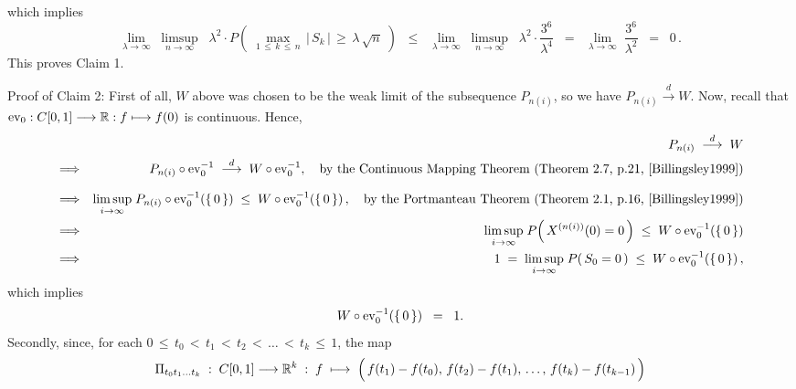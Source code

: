 which implies
\begin{equation*}
	\underset{\lambda\rightarrow\infty}{\lim}\;
	\underset{n\rightarrow\infty}{\limsup}\;\;
	\lambda^{2}\cdot
	P\!\left(\;\underset{1\,\leq\,k\,\leq\,n}{\max}\,\vert\,S_{k}\,\vert\,\geq\,\lambda\,\sqrt{n}\;\right)
\;\;\leq\;\;
	\underset{\lambda\rightarrow\infty}{\lim}\;
	\underset{n\rightarrow\infty}{\limsup}\;\;
	\lambda^{2}\cdot\dfrac{3^{6}}{\lambda^{4}}
\;\;=\;\;
	\underset{\lambda\rightarrow\infty}{\lim}\;
	\dfrac{3^{6}}{\lambda^{2}}
\;\;=\;\; 0\,.
\end{equation*}
This proves Claim 1.

\vskip 0.5cm
\noindent
Proof of Claim 2:\quad
First of all, $W$ above was chosen to be the weak limit of the subsequence $P_{n(i)}$,
so we have $P_{n(i)} \overset{d}{\longrightarrow} W$.
Now, recall that $\textnormal{ev}_{0} : C[0,1] \longrightarrow \mathbb{R} : f \longmapsto f(0)$ is continuous.
Hence,
\begin{eqnarray*}
&&
	P_{n(i)} \;\overset{d}{\longrightarrow}\; W
\\
&\Longrightarrow&
	\underset{{\color{white}i}}{P_{n(i)}}\circ\ev_{0}^{-1} \;\overset{d}{\longrightarrow}\; W\circ\ev_{0}^{-1},
	\quad
	\textnormal{by the Continuous Mapping Theorem (Theorem 2.7, p.21, \cite{Billingsley1999})}
\\
&\Longrightarrow&
	\underset{i\rightarrow\infty}{\lim\sup}\;P_{n(i)}\circ\ev_{0}^{-1}\!\left(\left\{\,0\,\right\}\right)
	\;\leq\; W\circ\ev_{0}^{-1}\!\left(\left\{\,0\,\right\}\right),
	\quad
	\textnormal{by the Portmanteau Theorem (Theorem 2.1, p.16, \cite{Billingsley1999})}
\\
&\Longrightarrow&
	\underset{i\rightarrow\infty}{\lim\sup}\;P\!\left(\,X^{(n(i))}(0) = 0\,\right)
	\;\leq\; W\circ\ev_{0}^{-1}\!\left(\left\{\,0\,\right\}\right)
\\
&\Longrightarrow&
	1 \;=\; \underset{i\rightarrow\infty}{\lim\sup}\;P\!\left(\,S_{0} = 0\,\right)
	\;\leq\; W\circ\ev_{0}^{-1}\!\left(\left\{\,0\,\right\}\right),
\end{eqnarray*}
which implies
\begin{equation*}
W\circ\textnormal{ev}_{0}^{-1}\!\left(\left\{\,0\,\right\}\right) \;\; = \;\; 1.
\end{equation*}
Secondly, since, for each $0 \,\leq\, t_{0} \,<\, t_{1} \,<\, t_{2} \,<\, \ldots \,<\, t_{k} \,\leq\, 1$,
the map
\begin{equation*}
	\Pitzk \;:\; \Czo \longrightarrow \Re^{k} \;:\;
	f \;\longmapsto\; \left(\,\overset{{\color{white}.}}{f}(t_{1}) - f(t_{0}),\,f(t_{2}) - f(t_{1}),\,\ldots,\,f(t_{k}) - f(t_{k-1})\,\right)
\end{equation*}
